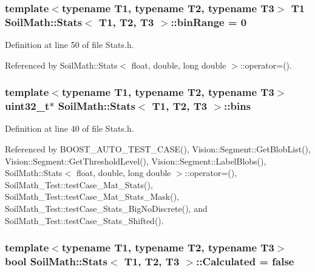 \subsubsection[{bin\+Range}]{\setlength{\rightskip}{0pt plus 5cm}template$<$typename T1, typename T2, typename T3$>$ T1 {\bf Soil\+Math\+::\+Stats}$<$ T1, T2, T3 $>$\+::bin\+Range = 0}\label{class_soil_math_1_1_stats_a00be1d2a705a8aba532fbe726001bbb2}


Definition at line 50 of file Stats.\+h.



Referenced by Soil\+Math\+::\+Stats$<$ float, double, long double $>$\+::operator=().

\hypertarget{class_soil_math_1_1_stats_a00778b298b1ebb335eb0c4eed69e471c}{}
\subsubsection[{bins}]{\setlength{\rightskip}{0pt plus 5cm}template$<$typename T1, typename T2, typename T3$>$ uint32\+\_\+t$\ast$ {\bf Soil\+Math\+::\+Stats}$<$ T1, T2, T3 $>$\+::bins}\label{class_soil_math_1_1_stats_a00778b298b1ebb335eb0c4eed69e471c}


Definition at line 40 of file Stats.\+h.



Referenced by B\+O\+O\+S\+T\+\_\+\+A\+U\+T\+O\+\_\+\+T\+E\+S\+T\+\_\+\+C\+A\+S\+E(), Vision\+::\+Segment\+::\+Get\+Blob\+List(), Vision\+::\+Segment\+::\+Get\+Threshold\+Level(), Vision\+::\+Segment\+::\+Label\+Blobs(), Soil\+Math\+::\+Stats$<$ float, double, long double $>$\+::operator=(), Soil\+Math\+\_\+\+Test\+::test\+Case\+\_\+\+Mat\+\_\+\+Stats(), Soil\+Math\+\_\+\+Test\+::test\+Case\+\_\+\+Mat\+\_\+\+Stats\+\_\+\+Mask(), Soil\+Math\+\_\+\+Test\+::test\+Case\+\_\+\+Stats\+\_\+\+Big\+No\+Discrete(), and Soil\+Math\+\_\+\+Test\+::test\+Case\+\_\+\+Stats\+\_\+\+Shifted().

\hypertarget{class_soil_math_1_1_stats_a3d3cd491b829b2e30f6752fee38fe261}{}
\subsubsection[{Calculated}]{\setlength{\rightskip}{0pt plus 5cm}template$<$typename T1, typename T2, typename T3$>$ bool {\bf Soil\+Math\+::\+Stats}$<$ T1, T2, T3 $>$\+::Calculated = false}\label{class_soil_math_1_1_stats_a3d3cd491b829b2e30f6752fee38fe261}


